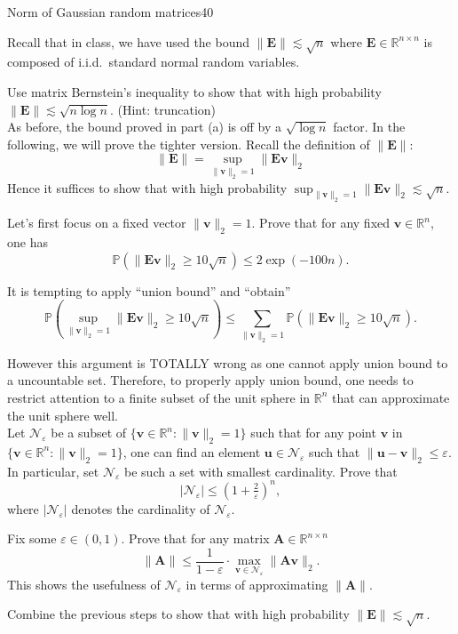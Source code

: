 \documentclass{article}
\begin{document}
\begin{problem}{Norm of Gaussian random matrices}{40}

Recall that in class, we have used the bound $\| \bm{E} \| \lesssim \sqrt{n}$ where $\bm{E} \in \mathbb{R}^{n \times n}$ is composed of i.i.d.~standard normal random variables. 

 Use matrix Bernstein's inequality to show that with high probability $\|\bm{E}\| \lesssim \sqrt{n \log n}$. (Hint: truncation) \\

As before, the bound proved in part (a) is off by a $\sqrt{\log n}$ factor. In the following, we will prove the tighter version. Recall the definition of $\|\bm{E}\|$:
\[
\|\bm{E}\| = \sup_{\| \bm{v}\|_2 =1} \|\bm{E} \bm{v} \|_2
\]
Hence it suffices to show that with high probability $\sup_{\| \bm{v}\|_2 =1} \|\bm{E} \bm{v} \|_2 \lesssim \sqrt{n}$.


Let's first focus on a fixed vector $\| \bm{v}\|_2 =1 $. Prove that for any fixed $\bm{v} \in \mathbb{R}^{n}$, one has 
\[
\mathbb{P}( \|\bm{E} \bm{v} \|_2 \geq 10\sqrt{n}) \leq 2 \exp(-100n).
\] 

It is tempting to apply ``union bound'' and ``obtain''
\[
\mathbb{P}( \sup_{\| \bm{v}\|_2 =1} \|\bm{E} \bm{v} \|_2 \geq 10\sqrt{n}) \leq \sum_{\| \bm{v}\|_2 =1} \mathbb{P}( \|\bm{E} \bm{v} \|_2 \geq 10\sqrt{n}).
\]

However this argument is TOTALLY wrong as one cannot apply union bound to a uncountable set. Therefore, to properly apply union bound, one needs to restrict attention to a finite subset of the unit sphere in $\mathbb{R}^{n}$ that can approximate the unit sphere well. \\

 Let $\mathcal{N}_{\varepsilon}$ be a subset of $\{\bm{v} \in \mathbb{R}^{n}: \| \bm{v}\|_2 =1\}$ such that for any point $\bm{v}$ in $\{\bm{v} \in \mathbb{R}^{n}: \| \bm{v}\|_2 =1\}$, one can find an element $\bm{u} \in \mathcal{N}_{\varepsilon}$ such that $\|\bm{u} - \bm{v}\|_{2} \leq \varepsilon$. In particular, set $\mathcal{N}_{\varepsilon}$ be such a set with smallest cardinality. Prove that 
\[
|\mathcal{N}_{\varepsilon}| \leq (1 + \tfrac{2}{\varepsilon})^{n},
\]
where $|\mathcal{N}_{\varepsilon}|$ denotes the cardinality of $\mathcal{N}_{\varepsilon}$.

Fix some $\varepsilon \in (0,1)$. Prove that for any matrix $\bm{A} \in \mathbb{R}^{n \times n}$
\[
\| \bm{A} \| \leq \frac{1}{ 1 - \varepsilon } \cdot \max_{\bm{v} \in \mathcal{N}_{\varepsilon} }\|\bm{A} \bm{v}\|_{2}.
\] 
This shows the usefulness of $\mathcal{N}_{\varepsilon}$ in terms of approximating $\|\bm{A}\|$.

 Combine the previous steps to show that with high probability $\|\bm{E}\| \lesssim \sqrt{n}$.
\end{problem}
\end{document}
